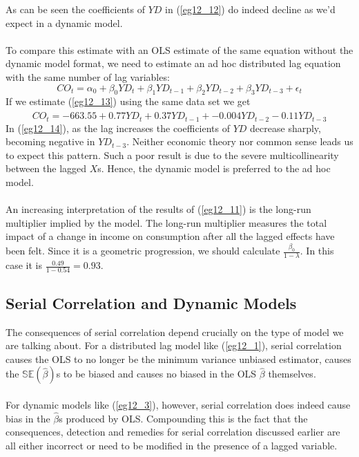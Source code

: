 \documentclass[11pt]{article}
\begin{document}
As can be seen the coefficients of $YD$ in (\ref{eg12_12}) do indeed decline as we'd expect in a dynamic model.\\ \\
To compare this estimate with an OLS estimate of the same equation without the dynamic model format, we need to estimate an ad hoc distributed lag equation with the same number of lag variables:
\begin{equation}
CO_t = \alpha_0 + \beta_0YD_t + \beta_1YD_{t-1} + \beta_2YD_{t-2} + \beta_3YD_{t-3} + \epsilon_t \label{eg12_13}
\end{equation}
If we estimate (\ref{eg12_13}) using the same data set we get
\begin{equation}
\widehat{CO}_t = -663.55 + 0.77YD_t + 0.37YD_{t-1} + -0.004YD_{t-2} - 0.11YD_{t-3} \label{eg12_14}
\end{equation}
In (\ref{eg12_14}), as the lag increases the coefficients of $YD$ decrease sharply, becoming negative in $YD_{t-3}$. Neither economic theory nor common sense leads us to expect this pattern. Such a poor result is due to the severe multicollinearity between the lagged $X$s. Hence, the dynamic model is preferred to the ad hoc model.\\ \\
An increasing interpretation of the results of (\ref{eg12_11}) is the long-run multiplier implied by the model. The long-run multiplier measures the total impact of a change in income on consumption after all the lagged effects have been felt. Since it is a geometric progression, we should calculate $\frac{\beta_0}{1-\lambda}$. In this case it is $\frac{0.49}{1-0.54} = 0.93$.
\subsection{Serial Correlation and Dynamic Models}
The consequences of serial correlation depend crucially on the type of model we are talking about. For a distributed lag model like (\ref{eg12_1}), serial correlation causes the OLS to no longer be the minimum variance unbiased estimator, causes the $\mathbb{SE}(\hat{\beta})$s to be biased and causes no biased in the OLS $\hat{\beta}$ themselves.\\ \\
For dynamic models like (\ref{eg12_3}), however, serial correlation does indeed cause bias in the $\hat{\beta}$s produced by OLS. Compounding this is the fact that the consequences, detection and remedies for serial correlation discussed earlier are all either incorrect or need to be modified in the presence of a lagged variable.
\end{document}
